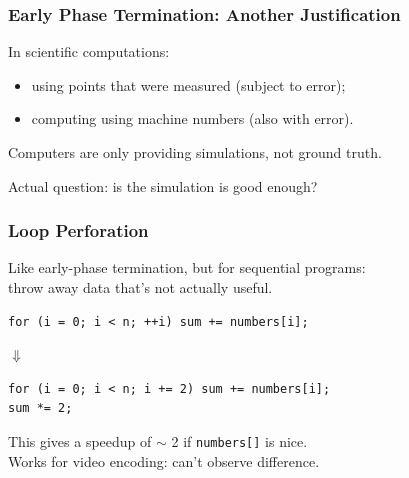 \documentclass[aspectratio=43]{beamer}
\newenvironment{changemargin}[1]{%
  \begin{list}{}{%
    \setlength{\topsep}{0pt}%
    \setlength{\leftmargin}{#1}%
    \setlength{\rightmargin}{1em}
    \setlength{\listparindent}{\parindent}%
    \setlength{\itemindent}{\parindent}%
    \setlength{\parsep}{\parskip}%
  }%
  \item[]}{\end{list}}
\begin{document}
\begin{frame}
  \frametitle{Early Phase Termination: Another Justification}

\begin{changemargin}{1.5cm}

In scientific computations:
\begin{itemize}
\item using points that were measured (subject to error);
\item computing using machine numbers (also with error). 
\end{itemize}

Computers are only providing simulations, not ground truth.

Actual question: is the simulation is good enough?
\end{changemargin}
\end{frame}


\begin{frame}[fragile]
  \frametitle{Loop Perforation}

\begin{changemargin}{2cm}
  Like early-phase termination, but for sequential programs:\\
  \qquad throw away data that's not actually useful.

  \begin{lstlisting}
for (i = 0; i < n; ++i) sum += numbers[i];
  \end{lstlisting}

  \begin{center}
    $\Downarrow$
  \end{center}

  \begin{lstlisting}
for (i = 0; i < n; i += 2) sum += numbers[i];
sum *= 2;
  \end{lstlisting}

  This gives a speedup of $\sim$ 2 if {\tt numbers[]} is nice.\\[1em]

  Works for video encoding: can't observe difference.


\end{changemargin}
\end{frame}
\end{document}
